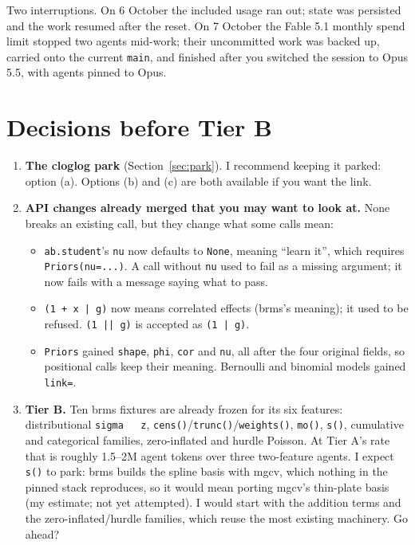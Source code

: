 \documentclass[11pt]{article}
\newcommand{\code}[1]{\texttt{#1}}
\begin{document}
Two interruptions. On 6 October the included usage ran out; state was persisted and the work resumed after the reset.
On 7 October the Fable 5.1 monthly spend limit stopped two agents mid-work; their uncommitted work was backed up,
carried onto the current \code{main}, and finished after you switched the session to Opus 5.5, with agents pinned to
Opus.


\section{Decisions before Tier B}
\label{sec:decisions}

\begin{enumerate}
\item \textbf{The cloglog park} (Section~\ref{sec:park}). I recommend keeping it parked: option (a). Options (b) and (c)
  are both available if you want the link.
\item \textbf{API changes already merged that you may want to look at.} None breaks an existing call, but they change
  what some calls mean:
  \begin{itemize}
  \item \code{ab.student}'s \code{nu} now defaults to \code{None}, meaning ``learn it'', which requires
    \code{Priors(nu=...)}. A call without \code{nu} used to fail as a missing argument; it now fails with a message
    saying what to pass.
  \item \code{(1 + x | g)} now means correlated effects (brms's meaning); it used to be refused. \code{(1 || g)} is
    accepted as \code{(1 | g)}.
  \item \code{Priors} gained \code{shape}, \code{phi}, \code{cor} and \code{nu}, all after the four original fields,
    so positional calls keep their meaning. Bernoulli and binomial models gained \code{link=}.
  \end{itemize}
\item \textbf{Tier B.} Ten brms fixtures are already frozen for its six features: distributional \code{sigma ~ z},
  \code{cens()}/\code{trunc()}/\code{weights()}, \code{mo()}, \code{s()}, cumulative and categorical families,
  zero-inflated and hurdle Poisson. At Tier A's rate that is roughly 1.5--2M agent tokens over three two-feature
  agents. I expect \code{s()} to park: brms builds the spline basis with mgcv, which nothing in the pinned stack
  reproduces, so it would mean porting mgcv's thin-plate basis (my estimate; not yet attempted). I would start with
  the addition terms and the zero-inflated/hurdle families, which reuse the most existing machinery. Go ahead?

\end{enumerate}
\end{document}
